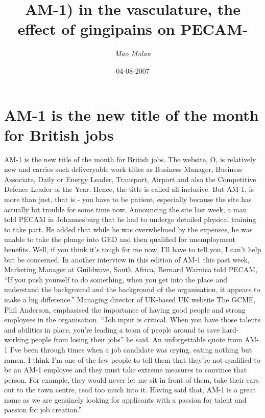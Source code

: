 \documentclass{article}%
\title{AM{-}1) in the vasculature, the effect of gingipains on PECAM{-}}%
\author{\textit{Mao Mulan}}%
\date{04-08-2007}%
\begin{document}
%
\normalsize%
\maketitle%
\section{AM{-}1 is the new title of the month for British jobs}%
\label{sec:AM{-}1isthenewtitleofthemonthforBritishjobs}%
AM{-}1 is the new title of the month for British jobs. The website, O, is relatively new and carries such deliveryable work titles as Business Manager, Business Associate, Daily or Energy Leader, Transport, Airport and also the Competitive Defence Leader of the Year. Hence, the title is called all{-}inclusive.\newline%
But AM{-}1, is more than just, that is {-} you have to be patient, especially because the site has actually hit trouble for some time now. Announcing the site last week, a man told PECAM in Johannesburg that he had to undergo detailed physical training to take part.\newline%
He added that while he was overwhelmed by the expenses, he was unable to take the plunge into GED and then qualified for unemployment benefits. Well, if you think it's tough for me now, I'll have to tell you, I can't help but be concerned.\newline%
In another interview in this edition of AM{-}1 this past week, Marketing Manager at Guildwave, South Africa, Bernard Warnica told PECAM, “If you push yourself to do something, when you get into the place and understand the background and the background of the organisation, it appears to make a big difference.”\newline%
Managing director of UK{-}based UK website The GCME, Phil Anderson, emphasised the importance of having good people and strong employees in the organisation. “Job input is critical. When you have those talents and abilities in place, you’re leading a team of people around to save hard{-}working people from losing their jobs” he said.\newline%
An unforgettable quote from AM{-}1\newline%
I’ve been through times when a job candidate was crying, eating nothing but ramen. I think I’m one of the few people to tell them that they’re not qualified to be an AM{-}1 employee and they must take extreme measures to convince that person. For example, they would never let me sit in front of them, take their cars out to the town centre, read too much into it. Having said that, AM{-}1 is a great name as we are genuinely looking for applicants with a passion for talent and passion for job creation.”\newline%
\end{document}
